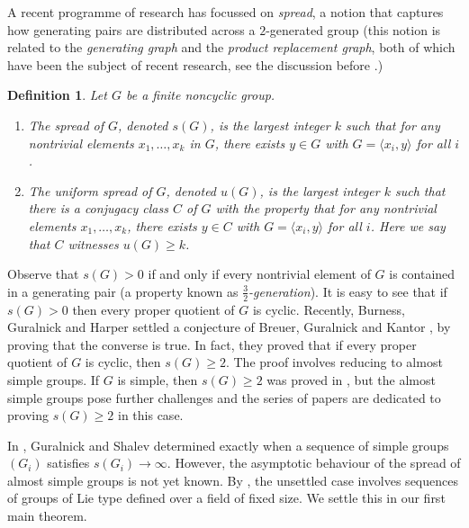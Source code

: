 \documentclass[11pt]{article}
\numberwithin{equation}{section}
\theoremstyle{shdefinition}
\newtheorem*{definition*}{Definition}
\theoremstyle{shplain}
\newcommand{\<}{\langle}
\renewcommand{\>}{\rangle}
\renewcommand{\geq}{\geqslant}
\renewcommand{\:}{\colon}
\begin{document}
A recent programme of research \cite{ref:BrennerWiegold75,ref:BreuerGuralnickKantor08,ref:BurnessGuest13,ref:BurnessGuralnickHarper,ref:GuralnickKantor00,ref:GuralnickShalev03,ref:Harper17,ref:Harper} has focussed on \emph{spread}, a notion that captures how generating pairs are distributed across a $2$-generated group (this notion is related to the \emph{generating graph} and the \emph{product replacement graph}, both of which have been the subject of recent research, see the discussion before \cite[Corollaries~6 and~7]{ref:BurnessGuralnickHarper}.)

\begin{definition*}
Let $G$ be a finite noncyclic group. 
\begin{enumerate}
\item The \emph{spread} of $G$, denoted $s(G)$, is the largest integer $k$ such that for any nontrivial elements $x_1, \dots, x_k$ in $G$, there exists $y \in G$ with $G = \< x_i, y \>$ for all $i$.
\item The \emph{uniform spread} of $G$, denoted $u(G)$, is the largest integer $k$ such that there is a conjugacy class $C$ of $G$ with the property that for any nontrivial elements $x_1, \dots, x_k$, there exists $y \in C$ with $G = \< x_i, y \>$ for all $i$. Here we say that $C$ witnesses $u(G) \geq k$.
\end{enumerate}
\end{definition*}

Observe that $s(G) > 0$ if and only if every nontrivial element of $G$ is contained in a generating pair (a property known as \emph{$\frac{3}{2}$-generation}). It is easy to see that if $s(G) > 0$ then every proper quotient of $G$ is cyclic. Recently, Burness, Guralnick and Harper \cite{ref:BurnessGuralnickHarper} settled a conjecture of Breuer, Guralnick and Kantor \cite{ref:BreuerGuralnickKantor08}, by proving that the converse is true. In fact, they proved that if every proper quotient of $G$ is cyclic, then $s(G) \geq 2$. The proof involves reducing to almost simple groups. If $G$ is simple, then $s(G) \geq 2$ was proved in \cite{ref:BreuerGuralnickKantor08}, but the almost simple groups pose further challenges and the series of papers \cite{ref:BurnessGuest13,ref:BurnessGuralnickHarper,ref:Harper17,ref:Harper} are dedicated to proving $s(G) \geq 2$ in this case. 

In \cite{ref:GuralnickShalev03}, Guralnick and Shalev determined exactly when a sequence of simple groups $(G_i)$ satisfies $s(G_i) \to \infty$. However, the asymptotic behaviour of the spread of almost simple groups is not yet known. By \cite[Corollary~9]{ref:BurnessGuralnickHarper}, the unsettled case involves sequences of groups of Lie type defined over a field of fixed size. We settle this in our first main theorem.
\end{document}
